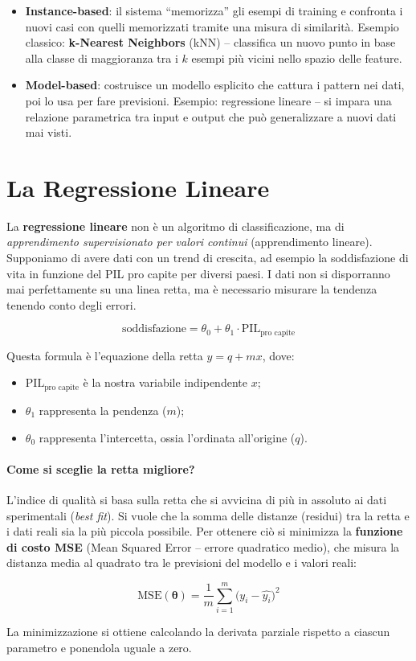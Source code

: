 \begin{itemize}
    \item \textbf{Instance-based}: il sistema ``memorizza'' gli esempi di training e confronta i nuovi casi con quelli memorizzati tramite una misura di similarità. Esempio classico: \textbf{k-Nearest Neighbors} (kNN) -- classifica un nuovo punto in base alla classe di maggioranza tra i $k$ esempi più vicini nello spazio delle feature.

    \item \textbf{Model-based}: costruisce un modello esplicito che cattura i pattern nei dati, poi lo usa per fare previsioni. Esempio: regressione lineare -- si impara una relazione parametrica tra input e output che può generalizzare a nuovi dati mai visti.
\end{itemize}

\section{La Regressione Lineare}

La \textbf{regressione lineare} non è un algoritmo di classificazione, ma di \emph{apprendimento supervisionato per valori continui} (apprendimento lineare). Supponiamo di avere dati con un trend di crescita, ad esempio la soddisfazione di vita in funzione del PIL pro capite per diversi paesi. I dati non si disporranno mai perfettamente su una linea retta, ma è necessario misurare la tendenza tenendo conto degli errori.

\begin{equation}
\boxed{\text{soddisfazione} = \theta_0 + \theta_1 \cdot \text{PIL}_{\text{pro capite}}}
\end{equation}

Questa formula è l'equazione della retta $y = q + mx$, dove:
\begin{itemize}
    \item $\text{PIL}_{\text{pro capite}}$ è la nostra variabile indipendente $x$;
    \item $\theta_1$ rappresenta la pendenza ($m$);
    \item $\theta_0$ rappresenta l'intercetta, ossia l'ordinata all'origine ($q$).
\end{itemize}

\paragraph*{Come si sceglie la retta migliore?}
L'indice di qualità si basa sulla retta che si avvicina di più in assoluto ai dati sperimentali (\textit{best fit}). Si vuole che la somma delle distanze (residui) tra la retta e i dati reali sia la più piccola possibile. Per ottenere ciò si minimizza la \textbf{funzione di costo MSE} (Mean Squared Error -- errore quadratico medio), che misura la distanza media al quadrato tra le previsioni del modello e i valori reali:

\[
\text{MSE}(\boldsymbol{\theta}) = \frac{1}{m} \sum_{i=1}^{m} \bigl({y}_{i} - \hat{y_{i}}\bigr)^2
\]

La minimizzazione si ottiene calcolando la derivata parziale rispetto a ciascun parametro e ponendola uguale a zero.